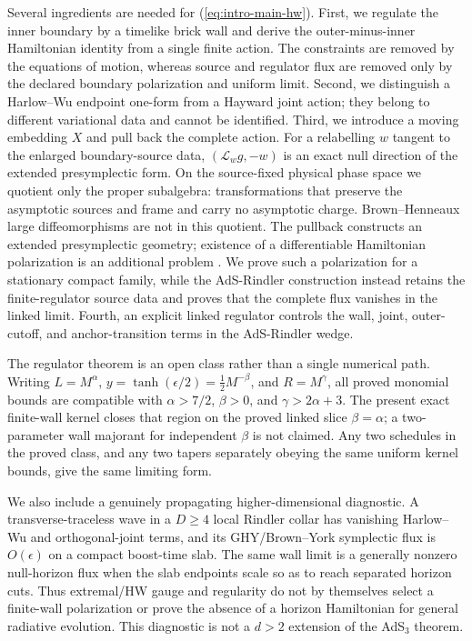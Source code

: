 Several ingredients are needed for (\ref{eq:intro-main-hw}). First, we regulate the inner boundary by a timelike brick wall and derive the outer-minus-inner Hamiltonian identity from a single finite action. The constraints are removed by the equations of motion, whereas source and regulator flux are removed only by the declared boundary polarization and uniform limit. Second, we distinguish a Harlow--Wu endpoint one-form from a Hayward joint action; they belong to different variational data and cannot be identified. Third, we introduce a moving embedding $X$ and pull back the complete action. For a relabelling $w$ tangent to the enlarged boundary-source data, $(\mathcal L_wg,-w)$ is an exact null direction of the extended presymplectic form. On the source-fixed physical phase space we quotient only the proper subalgebra: transformations that preserve the asymptotic sources and frame and carry no asymptotic charge. Brown--Henneaux large diffeomorphisms are not in this quotient. The pullback constructs an extended presymplectic geometry; existence of a differentiable Hamiltonian polarization is an additional problem \cite{Donnelly:2016auv,Speranza:2017guc}. We prove such a polarization for a stationary compact family, while the AdS-Rindler construction instead retains the finite-regulator source data and proves that the complete flux vanishes in the linked limit. Fourth, an explicit linked regulator controls the wall, joint, outer-cutoff, and anchor-transition terms in the AdS-Rindler wedge.

The regulator theorem is an open class rather than a single numerical path. Writing $L=M^\alpha$, $y=\tanh(\epsilon/2)=\tfrac12M^{-\beta}$, and $R=M^\gamma$, all proved monomial bounds are compatible with $\alpha>7/2$, $\beta>0$, and $\gamma>2\alpha+3$. The present exact finite-wall kernel closes that region on the proved linked slice $\beta=\alpha$; a two-parameter wall majorant for independent $\beta$ is not claimed. Any two schedules in the proved class, and any two tapers separately obeying the same uniform kernel bounds, give the same limiting form.

We also include a genuinely propagating higher-dimensional diagnostic. A transverse-traceless wave in a $D\geq4$ local Rindler collar has vanishing Harlow--Wu and orthogonal-joint terms, and its GHY/Brown--York symplectic flux is $O(\epsilon)$ on a compact boost-time slab. The same wall limit is a generally nonzero null-horizon flux when the slab endpoints scale so as to reach separated horizon cuts. Thus extremal/HW gauge and regularity do not by themselves select a finite-wall polarization or prove the absence of a horizon Hamiltonian for general radiative evolution. This diagnostic is not a $d>2$ extension of the AdS$_3$ theorem.

